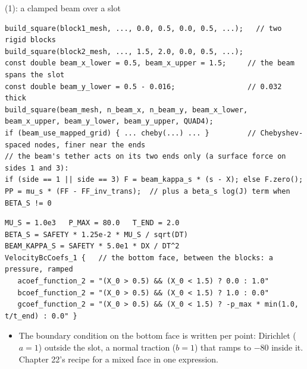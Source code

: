\documentclass[aspectratio=169,11pt]{beamer}
\begin{document}
\begin{frame}[fragile]{ (1): a clamped beam over a slot}
\label{fr:ex8}
\footnotesize
\begin{lstlisting}[style=cpptiny]
build_square(block1_mesh, ..., 0.0, 0.5, 0.0, 0.5, ...);   // two rigid blocks
build_square(block2_mesh, ..., 1.5, 2.0, 0.0, 0.5, ...);
const double beam_x_lower = 0.5, beam_x_upper = 1.5;     // the beam spans the slot
const double beam_y_lower = 0.5 - 0.016;                 // 0.032 thick
build_square(beam_mesh, n_beam_x, n_beam_y, beam_x_lower, beam_x_upper, beam_y_lower, beam_y_upper, QUAD4);
if (beam_use_mapped_grid) { ... cheby(...) ... }         // Chebyshev-spaced nodes, finer near the ends
// the beam's tether acts on its two ends only (a surface force on sides 1 and 3):
if (side == 1 || side == 3) F = beam_kappa_s * (s - X); else F.zero();
PP = mu_s * (FF - FF_inv_trans);  // plus a beta_s log(J) term when BETA_S != 0
\end{lstlisting}
\begin{lstlisting}[style=inputtiny]
MU_S = 1.0e3   P_MAX = 80.0   T_END = 2.0
BETA_S = SAFETY * 1.25e-2 * MU_S / sqrt(DT)
BEAM_KAPPA_S = SAFETY * 5.0e1 * DX / DT^2
VelocityBcCoefs_1 {   // the bottom face, between the blocks: a pressure, ramped
   acoef_function_2 = "(X_0 > 0.5) && (X_0 < 1.5) ? 0.0 : 1.0"
   bcoef_function_2 = "(X_0 > 0.5) && (X_0 < 1.5) ? 1.0 : 0.0"
   gcoef_function_2 = "(X_0 > 0.5) && (X_0 < 1.5) ? -p_max * min(1.0, t/t_end) : 0.0" }
\end{lstlisting}
\begin{itemize}
  \item The boundary condition on the bottom face is written per point: Dirichlet ($a = 1$) outside the slot, a normal traction ($b = 1$) that ramps to $-80$ inside it. Chapter 22's recipe for a mixed face in one expression.
\end{itemize}
\end{frame}
\end{document}
